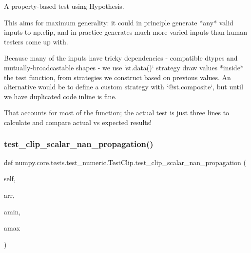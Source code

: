 \begin{DoxyVerb}A property-based test using Hypothesis.

This aims for maximum generality: it could in principle generate *any*
valid inputs to np.clip, and in practice generates much more varied
inputs than human testers come up with.

Because many of the inputs have tricky dependencies - compatible dtypes
and mutually-broadcastable shapes - we use `st.data()` strategy draw
values *inside* the test function, from strategies we construct based
on previous values.  An alternative would be to define a custom strategy
with `@st.composite`, but until we have duplicated code inline is fine.

That accounts for most of the function; the actual test is just three
lines to calculate and compare actual vs expected results!
\end{DoxyVerb}
 \mbox{\label{classnumpy_1_1core_1_1tests_1_1test__numeric_1_1TestClip_a845c9203eebce1258b3841fe78568c9f}} 
\subsubsection{\texorpdfstring{test\+\_\+clip\+\_\+scalar\+\_\+nan\+\_\+propagation()}{test\_clip\_scalar\_nan\_propagation()}}
{\footnotesize\ttfamily def numpy.\+core.\+tests.\+test\+\_\+numeric.\+Test\+Clip.\+test\+\_\+clip\+\_\+scalar\+\_\+nan\+\_\+propagation (\begin{DoxyParamCaption}\item[{}]{self,  }\item[{}]{arr,  }\item[{}]{amin,  }\item[{}]{amax }\end{DoxyParamCaption})}

\mbox{\label{classnumpy_1_1core_1_1tests_1_1test__numeric_1_1TestClip_a410083982bdaee604f0e9f9c47de46bc}} 
